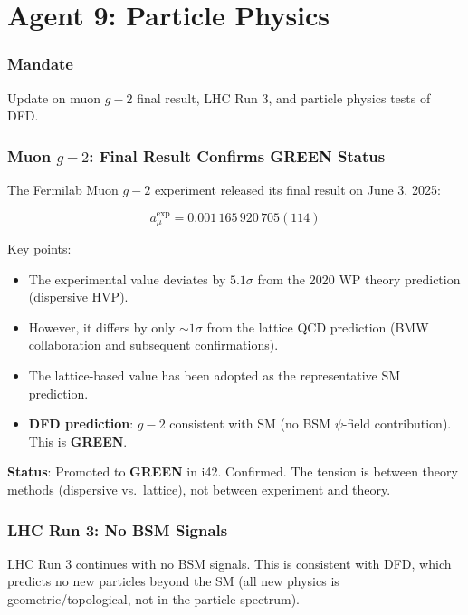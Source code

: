 \documentclass[11pt,a4paper]{article}
\newcommand{\GREEN}{\textcolor{dfdgreen}{\textbf{GREEN}}}
\begin{document}
\part{Agent 9: Particle Physics}
\label{part:agent9}

\section{Mandate}

Update on muon $g-2$ final result, LHC Run 3, and particle physics tests of DFD.

\section{Muon $g-2$: Final Result Confirms GREEN Status}

The Fermilab Muon $g-2$ experiment released its final result on June 3, 2025:

\begin{equation}
a_\mu^{\text{exp}} = 0.001\,165\,920\,705(114)
\end{equation}

Key points:
\begin{itemize}
\item The experimental value deviates by $5.1\sigma$ from the 2020 WP theory prediction (dispersive HVP).
\item However, it differs by only $\sim 1\sigma$ from the lattice QCD prediction (BMW collaboration and subsequent confirmations).
\item The lattice-based value has been adopted as the representative SM prediction.
\item \textbf{DFD prediction}: $g-2$ consistent with SM (no BSM $\psi$-field contribution). This is \GREEN.
\end{itemize}

\textbf{Status}: Promoted to \GREEN{} in i42. Confirmed. The tension is between theory methods (dispersive vs.\ lattice), not between experiment and theory.

\section{LHC Run 3: No BSM Signals}

LHC Run 3 continues with no BSM signals. This is consistent with DFD, which predicts no new particles beyond the SM (all new physics is geometric/topological, not in the particle spectrum).
\end{document}
